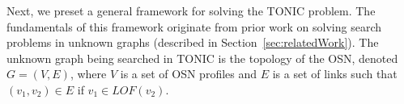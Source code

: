 \documentclass[journal]{IEEEtran}
\newcommand{\acquire}[1]{{\em Acquire(#1)}}
\begin{document}




Next, we preset a general framework for solving the TONIC problem. The fundamentals of this framework originate from prior work on solving search problems in unknown graphs (described in Section~\ref{sec:relatedWork}). The unknown graph being searched in TONIC is the topology of the OSN, denoted $G=(V,E)$, where $V$ is a set of OSN profiles and $E$ is a set of links such that \((v_1,v_2)\in E\) if $v_1\in LOF(v_2)$. 
\end{document}
